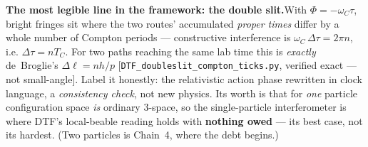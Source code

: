\documentclass[11pt]{article}
\begin{document}
\begin{tcolorbox}[keybox]
\textbf{The most legible line in the framework: the double slit.}\enspace With $\Phi=-\omega_C\tau$,
bright fringes sit where the two routes' accumulated \emph{proper times} differ by a whole number of
Compton periods --- constructive interference is $\omega_C\,\Delta\tau=2\pi n$, i.e. $\Delta\tau=nT_C$.
For two paths reaching the same lab time this is \emph{exactly} de~Broglie's $\Delta\ell=nh/p$
[\texttt{DTF\_doubleslit\_compton\_ticks.py}, verified exact --- not small-angle]. Label it honestly:
the relativistic action phase rewritten in clock language, a \emph{consistency check}, not new physics.
Its worth is that for \emph{one} particle configuration space \emph{is} ordinary 3-space, so the
single-particle interferometer is where DTF's local-beable reading holds with \textbf{nothing owed} ---
its best case, not its hardest. (Two particles is Chain~4, where the debt begins.)
\end{tcolorbox}
\end{document}
